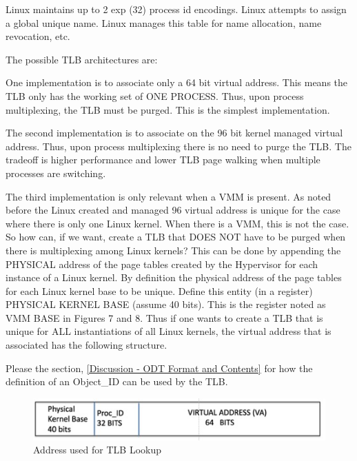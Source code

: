 \documentclass{article}
\begin{document}
Linux maintains up to 2  exp (32)  process  id encodings. 
Linux attempts to assign a global unique name.  Linux manages this table for name allocation,  name  revocation, etc.  

The possible TLB architectures are:

One implementation is to associate only a 64 bit virtual address.  This means the TLB only has the working set of ONE PROCESS.  Thus, upon process multiplexing,  the TLB must be purged.  This is the simplest  implementation.

The second  implementation is to associate on the 96 bit kernel managed virtual address.  Thus, upon  process multiplexing  there is no need to purge the TLB.  The tradeoff is higher performance and lower TLB page walking when multiple processes are switching.


The third implementation is only relevant when a VMM is present.  As noted before the Linux  created and managed 96 virtual address is  unique for  the case where there is only one Linux kernel.   When there is a VMM,  this is not the case.  So how can, if we want, create a TLB that DOES NOT have to be purged when there is multiplexing among Linux kernels?  This can be done by appending the PHYSICAL address of the page tables created by the Hypervisor for each instance of a Linux kernel.  By definition the physical address of the page tables for each Linux kernel base to be unique.  Define this entity (in a register) 	PHYSICAL KERNEL BASE (assume 40 bits). This is the register noted as VMM BASE in Figures 7 and 8.    Thus if one wants to create a TLB that is unique for ALL instantiations of all Linux kernels,  the virtual address that is associated has the following structure. 

Please the section,
\ref{Discussion -  ODT Format and Contents}  for how the definition of an Object\_ID  can be used by the TLB.


\begin{figure}
\begin{center}
\includegraphics [scale = .7]
{figures/figure12_address_tlb_lookup.jpg}
\caption{Address used for TLB Lookup}
\end{center}
\end{figure}

\end{document}
